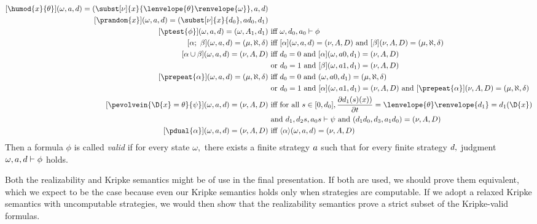 \documentclass[12pt]{cmuthesis}
\theoremstyle{definition}
\theoremstyle{remark}
\newcommand{\ivr}{\psi}
\newcommand{\om}{\omega}
\newcommand{\tint}[2]{\lenvelope{#1}\renvelope{#2}}
\begin{document}
\begin{align*}
\rzD{\sa,\aa,\da}{\humod{x}{\theta}}{\subst[\sb]{x}{\tint{\theta}{\sa}},\aa,\da}&\\
\rzD{\sa,\aa,\da}{\prandom{x}}{\subst[\sb]{x}{\rzFst{\da}},\rzApp{\aa}{\rzFst{\da}},\rzSnd{\da}}&\\
\rzD{\sa,\aa,\da}{\ptest{\phi}}{\sa,\rzSnd{\ab},\rzSnd{\da}}&\text{ iff }\rzF{\sa,\rzFst{\da},\rzFst{\aa}}{\phi}\\
\rzD{\sa,\aa,\da}{\alpha;~\beta}{\Sc,\ac,\dc}&\text{ iff }\rzD{\sa,\aa,\da}{\alpha}{\sb,\ab,\db}\text{ and }\rzD{\sb,\ab,\db}{\beta}{\Sc,\ac,\dc}\\
\rzD{\sa,\aa,\da}{\alpha \cup \beta}{\sb,\ab,\db}&\text{ iff }\rzFst{\da}=0\text{ and }\rzD{\sa,\aa 0,\rzSnd{\da}}{\alpha}{\sb,\ab,\db}\\
                                                 &\text{ or } \rzFst{\da}=1\text{ and }\rzD{\sa,\aa 1,\rzSnd{\da}}{\beta} {\sb,\ab,\db}\\
\rzD{\sa,\aa,\da}{\prepeat{\alpha}}{\Sc,\ac,\dc}&\text{ iff }\rzFst{\da}=0\text{ and }(\sa,\aa 0,\rzSnd{\da})=(\Sc,\ac,\dc)\\
                                                &\text{ or }\rzFst{\da}=1\text{ and }\rzD{\sa,\aa 1,\rzSnd{\da}}{\alpha}{\sb,\ab,\db}\text{ and }\rzD{\sb,\ab,\db}{\prepeat{\alpha}}{\Sc,\ac,\dc}\\
\rzD{\sa,\aa,\da}{\pevolvein{\D{x}=\theta}{\ivr}}{\sb,\ab,\db}&\text{ iff for all }s\in[0,\rzFst{\da}], \frac{\partial \rzSnd{\da}(s)(x))}{\partial t}=\tint{\theta}{\rzSnd{\da}}=\rzSnd{\da}(\D{x})\\
                                                 &\text{ and }\rzF{\rzSnd{\da},\rzApp{\rzThd{\da}}{s},\rzApp{\rzFst{\aa}}{s}}{\ivr}\text{ and } (\rzApp{\rzSnd{\da}}{\rzFst{\da}},\rzFrt{\da},\rzApp{\rzSnd{\aa}}{\rzFst{\da}})=(\sb,\ab,\db)\\
\rzD{\sa,\aa,\da}{\pdual{\alpha}}{\sb,\ab,\db} &\text{ iff }\rzA{\sa,\aa,\da}{\alpha}{\sb,\ab,\db}
\end{align*}
Then a formula $\phi$ is called \emph{valid} if for every state $\om,$ there exists a finite strategy $\aa$ such that for every finite strategy $\da,$ judgment $\rzF{\om,\aa,\da}{\phi}$ holds.

Both the realizability and Kripke semantics might be of use in the final presentation.
If both are used, we should prove them equivalent, which we expect to be the case because even our Kripke semantics holds only when strategies are computable.
If we adopt a relaxed Kripke semantics with uncomputable strategies, we would then show that the realizability semantics prove a strict subset of the Kripke-valid formulas.
\end{document}
